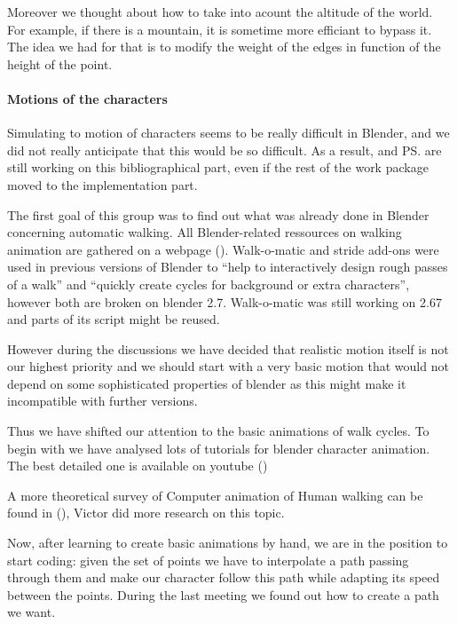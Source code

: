 Moreover we thought about how to take into acount the altitude of the world. For example, if there is a mountain, it is sometime more efficiant to bypass it. The idea we had for that is to modify the weight of the edges in function of the height of the point. 

\paragraph{Motions of the characters}

Simulating to motion of characters seems to be really difficult in Blender, and we did not really anticipate that this would be so difficult. As a result, \vl and \ps are still working on this bibliographical part, even if the rest of the work package moved to the implementation part.


\par The first goal of this group was to find out what was already done in Blender concerning automatic walking. All Blender-related ressources on walking animation are gathered on a webpage (\cite{blwikiwalking}). Walk-o-matic and stride add-ons were used in previous versions of Blender to ``help to interactively design rough passes of a walk'' and ``quickly create cycles for background or extra characters'', however both are broken on blender 2.7. Walk-o-matic was still working on 2.67 and parts of its script might be reused.

\par However during the discussions we have decided that realistic motion itself is not our highest priority and we should start with a very basic motion that would not depend on some sophisticated properties of blender as this might make it incompatible with further versions.

\par Thus we have shifted our attention to the basic animations of walk cycles. To begin with we have analysed lots of tutorials for blender character animation. The best detailed one is available on youtube (\cite{tuto_walk}) 

\par A more theoretical survey of Computer animation of Human walking can be found in (\cite{th_walking}), Victor did more research on this topic.


\par Now, after learning to create basic animations by hand, we are in the position to start coding: given the set of points we have to interpolate a path passing through them and make our character follow this path while adapting its speed between the points. During the last meeting we found out how to create a path we want.

